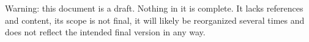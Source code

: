 %

Warning: this document is a draft. Nothing in it is complete. It lacks references and content, its scope is not final, it will likely be reorganized several times and does not reflect the intended final version in any way.















\appendix



